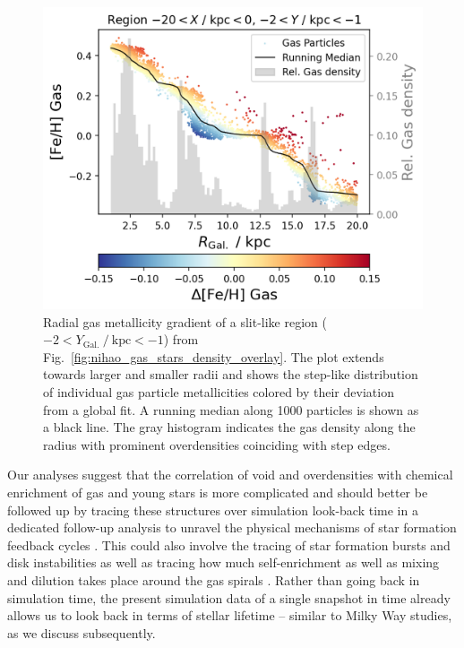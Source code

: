 \documentclass[twocolumn,apj,numberedappendix,appendixfloats,twocolappendix]{openjournal}
\begin{document}
\begin{CJK*}{UTF8}{gbsn}
\begin{figure}
    \centering
    \includegraphics[width=\columnwidth]{figures/region_r_feh_gas_density.png}
    \caption{Radial gas metallicity gradient of a slit-like region ($-2 < Y_\mathrm{Gal.}~/~\mathrm{kpc} < -1$) from Fig.~\ref{fig:nihao_gas_stars_density_overlay}. The plot extends towards larger and smaller radii and shows the step-like distribution of individual gas particle metallicities colored by their deviation from a global fit. A running median along 1000 particles is shown as a black line. The gray histogram indicates the gas density along the radius with prominent overdensities coinciding with step edges.}
    \label{fig:region_r_feh_gas_density}
\end{figure}

Our analyses suggest that the correlation of void and overdensities with chemical enrichment of gas and young stars is more complicated and should better be followed up by tracing these structures over simulation look-back time in a dedicated follow-up analysis to unravel the physical mechanisms of star formation feedback cycles . This could also involve the tracing of star formation bursts and disk instabilities \citep{Sanchez2014, SanchezBlazquez2014, Ho2015} as well as tracing how much self-enrichment as well as mixing and dilution takes place around the gas spirals \citep{Ho2017c}. Rather than going back in simulation time, the present simulation data of a single snapshot in time already allows us to look back in terms of stellar lifetime -- similar to Milky Way studies, as we discuss subsequently.


\end{CJK*}
\end{document}
